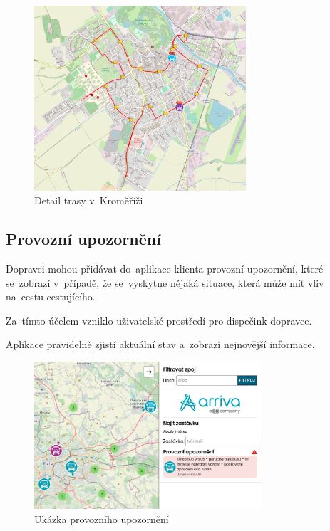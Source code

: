\begin{figure}[H]
    \centering
    \includegraphics[width=0.7\textwidth]{images/krom_line_6.png}
    \caption{Detail trasy v~Kroměříži}
    \label{trasa}
\end{figure}

\subsection{Provozní upozornění} Dopravci mohou přidávat do~aplikace klienta provozní upozornění, které se~zobrazí v~případě, že se~vyskytne nějaká situace, která může mít vliv na~cestu cestujícího.\par
Za~tímto účelem vzniklo uživatelské prostředí pro dispečink dopravce.

Aplikace pravidelně zjistí aktuální stav a~zobrazí nejnovější informace.

\par \begin{figure}[H]
    \centering
    \includegraphics[width=0.75\textwidth]{images/global_arriva_event.png}
    \caption{Ukázka provozního upozornění}
    \label{upozorneni}
\end{figure}

